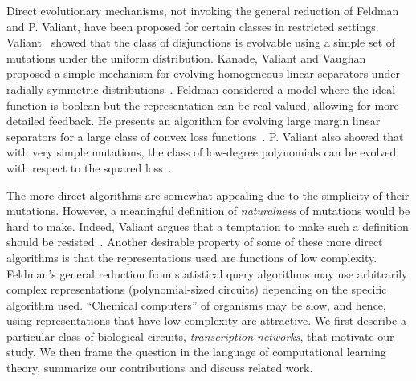 Direct evolutionary mechanisms, not invoking the general
reduction of Feldman and P. Valiant, have been proposed for certain classes in
restricted settings. Valiant~\cite{Valiant:2009-evolvability} showed that the
class of disjunctions is evolvable using a simple set of mutations under the
uniform distribution. Kanade, Valiant and Vaughan proposed a simple mechanism
for evolving homogeneous linear separators under radially symmetric
distributions~\cite{KVV:2010-drift}.  Feldman considered a model where the ideal
function is boolean but the representation can be real-valued, allowing for more
detailed feedback. He presents an algorithm for evolving large margin linear
separators for a large class of convex loss functions~\cite{Feldman:2011-LTF}.
P. Valiant also showed that with very simple mutations, the class of low-degree
polynomials can be evolved with respect to the squared
loss~\cite{Valiant:2012-real}.

The more direct algorithms are somewhat appealing due to the simplicity of their
mutations.  However, a meaningful definition of \emph{naturalness} of mutations
would be hard to make. Indeed, Valiant argues that a temptation to make such a
definition should be resisted~\cite{Valiant:2013-PAC}. Another
desirable property of some of these more direct algorithms is that the
representations used are functions of low complexity. Feldman's general
reduction from statistical query algorithms may use arbitrarily complex
representations (polynomial-sized circuits) depending on the specific algorithm
used. ``Chemical computers'' of organisms may be slow, and hence, using
representations that have low-complexity are attractive. We first describe a
particular class of biological circuits, \emph{transcription networks}, that
motivate our study. We then frame the question in the language of computational
learning theory, summarize our contributions and discuss related work.


